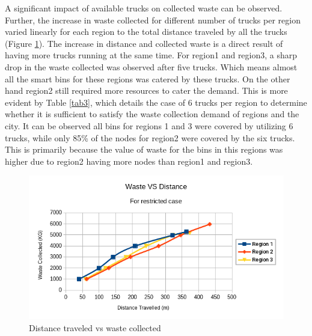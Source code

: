 \documentclass[12pt]{article}
\begin{document}
A significant impact of available trucks on collected waste can be observed. Further, the increase in waste collected for different number of trucks per region varied linearly for each region to the total distance traveled by all the trucks (Figure \ref{figz}). The increase in distance and collected waste is a direct result of having more trucks running at the same time. For region1 and region3, a sharp drop in the waste collected was observed after five trucks. Which means almost all the smart bins for these regions was catered by these trucks. On the other hand region2 still required more resources to cater the demand. This is more evident by Table \ref{tab3}, which details the case of 6 trucks per region to determine whether it is sufficient to satisfy the waste collection demand of regions and the city. It can be observed all bins for regions 1 and 3 were covered by utilizing 6 trucks, while only 85\% of the nodes for region2 were covered by the six trucks. This is primarily because the value of waste for the bins in this regions was higher due to region2 having more nodes than region1 and region3.

\begin{figure}[H]
    \centering
    \includegraphics[scale=0.6]{distance_VS_garbage_restricted.png}
    \caption{Distance traveled vs waste collected}\label{figz}
\end{figure}
\end{document}
